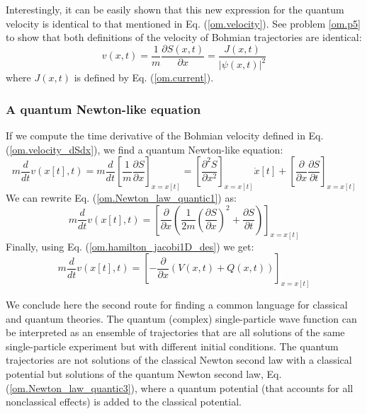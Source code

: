\documentclass[nofootinbib, secnumarabic, amsmath, nobibnotes,11pt,aps,pra, floatfix]{revtex4-1}
\newcommand{\eref}[1]{Eq. (\ref{#1})}
\begin{document}
Interestingly, it can be easily shown that this new expression for
the quantum velocity is identical to that mentioned in
\eref{om.velocity}. See problem \ref{om.p5} to show that both
definitions of the velocity of Bohmian trajectories are identical:
\begin{equation}
v(x,t) = \frac {1} {m} \frac {\partial S(x,t)} {\partial x} = \frac{J(x,t)} {|\psi(x,t)|^2}
\label{om.velocity2}
\end{equation}
where $J(x,t)$ is defined by \eref{om.current}.

\subsubsection{A quantum Newton-like equation}

If we compute the time derivative of the Bohmian velocity defined in \eref{om.velocity_dSdx}, we find a quantum Newton-like equation:
\begin{equation}
\label{om.Newton_law_quantic1}
m\frac {d} {dt} v(x[t],t)\! =\! m \frac {d} {dt} \left[ \frac{1}{m} \frac {\partial S} {\partial x} \right]_{x = x[t]} \!=\! \left[ \frac {\partial^2 S} {\partial x^2}\right]_{x = x[t]} \dot{x}[t] + \left[\frac {\partial} {\partial x} \frac {\partial S} {\partial t} \right]_{x = x[t]}
\end{equation}
We can rewrite \eref{om.Newton_law_quantic1} as:
\begin{equation}
\label{om.Newton_law_quantic2}
m\frac {d} {dt} v(x[t],t) = \left[ \frac {\partial} {\partial x} \left(\frac {1} {2m} \left(\frac {\partial S} {\partial x} \right)^{2} + \frac {\partial S} {\partial t} \right) \right]_{x = x[t]}
\end{equation}
Finally, using \eref{om.hamilton_jacobi1D_des} we get:
\begin{equation}
\label{om.Newton_law_quantic3}
m\frac {d} {dt} v(x[t],t) = \left[ -\frac {\partial} {\partial x} \left(V(x,t) + Q(x,t) \right) \right]_{x = x[t]}
\end{equation}

We conclude here the second route for finding a common language for
classical and quantum theories. The quantum (complex)
single-particle wave function can be interpreted as an ensemble of
trajectories that are all solutions of the same single-particle
experiment but with different initial conditions. The quantum
trajectories are not solutions of the classical Newton second  law with a
classical potential but solutions of the quantum Newton second law,
\eref{om.Newton_law_quantic3}, where a quantum potential (that
accounts for all nonclassical effects) is added to the classical
potential.
\end{document}
